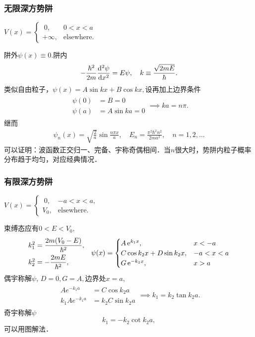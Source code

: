 \subsubsection*{无限深方势阱}
\begin{center}
	$V(x)=\begin{cases}
			~0,      & 0<x<a             \\
			+\infty, & \text{elsewhere.}
		\end{cases}$
\end{center}
阱外$\psi(x)\equiv 0.$阱内
\[
	-\frac{\hbar^2}{2m}\dv[2]{\psi}x=E\psi,\quad k\equiv\frac{\sqrt{2mE}}\hbar.
\]
类似自由粒子，$\psi(x)=A\sin kx+B\cos kx,$设再加上边界条件
\begin{align*}
	\begin{aligned}
		\psi(0)&=B=0 \\
		\psi(a)&=A\sin ka=0
	\end{aligned}
	\implies ka=n\pi.
\end{align*}
继而
\begin{align}
	\psi_n(x)=\sqrt{\frac2a}\sin\frac{n\pi x}a,\quad E_n=\frac{\pi^2\hbar^2n^2}{2ma^2},\quad n=1,2,\ldots
\end{align}
可以证明：波函数正交归一、完备、宇称奇偶相间．当$n$很大时，势阱内粒子概率分布趋于均匀，对应经典情况．

\subsubsection*{有限深方势阱}
\begin{center}
	$V(x)=\begin{cases}
			~0,  & -a<x<a,           \\
			V_0, & \text{elsewhere.}
		\end{cases}$
\end{center}
束缚态应有$0<E<V_0,$
\begin{align*}
	\begin{aligned}
		k_1^2 & =\frac{2m(V_0-E)}{\hbar^2}, \\
		k_2^2 & =-\frac{2mE}{\hbar^2},
	\end{aligned}\quad
	\psi(x)=\begin{cases}
		A\e{k_1x},             & x<-a   \\
		C\cos k_2x+D\sin k_2x, & -a<x<a \\
		G\e{-k_1x},            & x>a
	\end{cases}
\end{align*}
偶宇称解$\psi$, $D=0,G=A,$边界处$x=a$,
\begin{align*}
	\begin{aligned}
		Ae^{-k_1a}    & =C\cos k_2a    \\
		k_1Ae^{-k_1a} & =k_2C\sin k_2a
	\end{aligned}
	\implies
	k_1=k_2\tan k_2a.
\end{align*}
奇宇称解$\psi$
\[
	k_1=-k_2\cot k_2a,
\]
可以用图解法．

